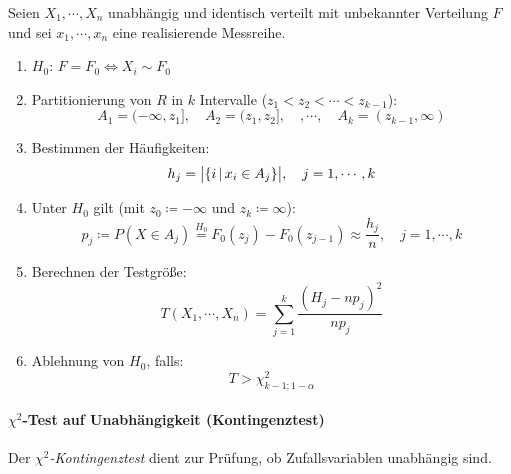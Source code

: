			Seien \( X_1, \cdots, X_n \) unabhängig und identisch verteilt mit unbekannter Verteilung \(F\) und sei \(x_1, \cdots, x_n\) eine realisierende Messreihe.
			\begin{enumerate}
				\item \(H_0\): \quad \( F = F_0 \iff X_i \sim F_0 \)
				\item Partitionierung von \(R\) in \(k\) Intervalle (\( z_1 < z_2 < \cdots < z_{k-1} \)):
					\begin{equation*}
						A_1 = (-\infty, z_1], \quad A_2 = (z_1, z_2], \quad, \cdots, \quad A_k = (z_{k-1}, \infty)
					\end{equation*}
				\item Bestimmen der Häufigkeiten:
					\begin{equation*}
						h_j = \big| \{ i \,\vert\, x_i \in A_j \} \big|, \quad j = 1, \cdots, k
					\end{equation*}
				\item Unter \( H_0 \) gilt (mit \( z_0 \coloneqq -\infty \) und \( z_k \coloneqq \infty \)):
					\begin{equation*}
						p_j \coloneqq P(X \in A_j) \overset{H_0}{=} F_0(z_j) - F_0(z_{j-1}) \approx \frac{h_j}{n}, \quad j = 1, \cdots, k
					\end{equation*}
				\item Berechnen der Testgröße:
					\begin{equation*}
						T(X_1, \cdots, X_n) = \sum_{j = 1}^{k} \frac{(H_j - n p_j)^2}{n p_j}
					\end{equation*}
				\item Ablehnung von \(H_0\), falls:
					\begin{equation*}
						T > \chi_{k - 1; 1 - \alpha}^2
					\end{equation*}
			\end{enumerate}

		\paragraph{\(\chi^2\)-Test auf Unabhängigkeit (Kontingenztest)}
			Der \textit{\(\chi^2\)-Kontingenztest} dient zur Prüfung, ob Zufallsvariablen unabhängig sind.

